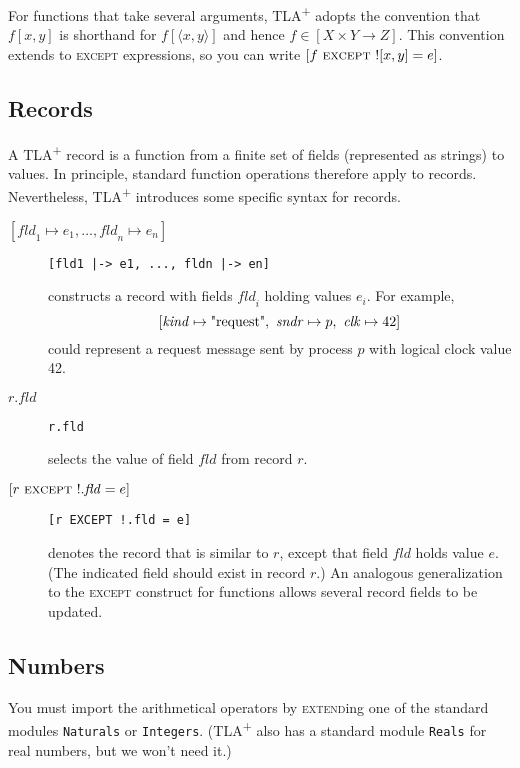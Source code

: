 \documentclass[11pt,fleqn]{article}
\newcommand{\tlaplus}{TLA\textsuperscript{+}\xspace}
\newcommand{\kw}[1]{\textnormal{\textsc{#1}}}
\newcommand{\seq}[1]{\ensuremath{\langle #1 \rangle}}
\newcommand{\str}[1]{\textnormal{"#1"}}
\newcommand{\EXCEPT}{\kw{except}}
\newcommand{\EXTEND}{\kw{extend}}
\begin{document}
For functions that take several arguments, \tlaplus adopts the convention that
$f[x,y]$ is shorthand for $f[\seq{x,y}]$ and hence $f \in [X \times Y
\rightarrow Z]$. This convention extends to \EXCEPT{} expressions, so you can
write $[f\ \EXCEPT\ ![x,y] = e]$.


\subsection{Records}

A \tlaplus record is a function from a finite set of fields (represented as
strings) to values. In principle, standard function operations therefore apply
to records. Nevertheless, \tlaplus introduces some specific syntax for records.

\begin{description}
\item[\mbox{$[\mathit{fld}_1 \mapsto e_1, \dots, \mathit{fld}_n \mapsto e_n]$}]\qquad
  \verb![fld1 |-> e1, ..., fldn |-> en]!

  constructs a record with fields $\mathit{fld}_i$ holding values $e_i$. For
  example,
  \[
    [\mathit{kind} \mapsto \str{request},\
     \mathit{sndr} \mapsto p,\
     \mathit{clk} \mapsto 42]
  \]
  could represent a request message sent by process $p$ with logical clock value 42.

\item[$r.\mathit{fld}$]\qquad \verb|r.fld|

  selects the value of field $\mathit{fld}$ from record $r$.

\item[\mbox{$[r\ \EXCEPT\ !.\mathit{fld} = e]$}]\qquad
  \verb|[r EXCEPT !.fld = e]|

  denotes the record that is similar to $r$, except that field $\mathit{fld}$
  holds value $e$. (The indicated field should exist in record $r$.) An
  analogous generalization to the \EXCEPT{} construct for functions allows
  several record fields to be updated.
\end{description}


\subsection{Numbers}

You must import the arithmetical operators by \EXTEND{}ing one of the standard
modules \verb|Naturals| or \verb|Integers|. (\tlaplus also has a standard module
\verb|Reals| for real numbers, but we won't need it.)
\end{document}

